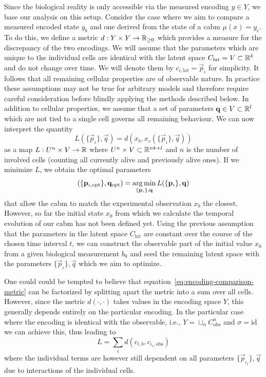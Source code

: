 Since the biological reality is only accessible via the measured encoding $y\in Y$, we base our
analysis on this setup.
Consider the case where we aim to compare a measured encoded state $y_b$ and one derived from the
state of a \ac{cabm} $\mu(x)=y_c$.
To do this, we define a metric $d:Y\times Y\rightarrow\mathbb{R}_{\geq 0}$ which provides a measure for the
discrepancy of the two encodings.
We will assume that the parameters which are unique to the individual cells are identical with the
latent space $C_\text{lat}=V\subset\mathbb{R}^k$ and do not change over time.
We will denote them by $c_{\iota,\text{lat}}=\vec{p}_\iota$ for simplicity.
It follows that all remaining cellular properties are of observable nature.
In practice these assumptions may not be true for arbitrary models and therefore require careful
consideration before blindly applying the methods described below.
In addition to cellular properties, we assume that a set of parameters $\mathbf{q}\in V\subset\mathbb{R}^l$
which are not tied to a single cell governs all remaining behaviour.
We can now interpret the quantity
\begin{equation}
    L(\{\vec{p}_\iota\},\vec{q}) = d(x_b,x_c(\{\vec{p}_\iota\},\vec{q}))
    \label{eq:encoding-comparison-metric}
\end{equation}
as a map $L:U^n\times V\rightarrow\mathbb{R}$ where $U^n\times V\subset\mathbb{R}^{nk+l}$ and $n$ is the number of
involved cells (counting all currently alive and previously alive ones).
If we minimize $L$, we obtain the optimal parameters
\begin{equation}
    (\{\mathbf{p}_{\iota,\text{opt}}\},\mathbf{q}_\text{opt})=
        \operatorname*{arg\,min}_{\{\mathbf{p}_\iota\},\mathbf{q}} L(\{\mathbf{p}_\iota\},\mathbf{q})
\end{equation}
that allow the \ac{cabm} to match the experimental observation $x_b$ the closest.
However, so far the initial state $x_0$ from which we calculate the temporal evolution of our
\ac{cabm} has not been defined yet.
Using the previous assumption that the parameters in the latent space $C_\text{lat}$ are constant
over the course of the chosen time interval $t$, we can construct the observable part of the initial
value $x_0$ from a given biological measurement $b_0$ and seed the remaining latent space with the
parameters $\{\vec{p}_\iota\},\vec{q}$ which we aim to optimize.

One could could be tempted to believe that equation~\eqref{eq:encoding-comparison-metric} can be
factorized by splitting apart the metric into a sum over all cells.
However, since the metric $d(\cdot,\cdot)$ takes values in the encoding space $Y$, this generally
depends entirely on the particular encoding.
In the particular case where the encoding is identical with the observable, i.e.,
$Y=\sqcup_nC_\text{obs}^n$ and $\sigma=\text{id}$ we can achieve this, thus leading to
\begin{equation}
    L=\sum\limits_i d(c_{i,b},c_{\iota_i,\text{obs}})
\end{equation}
where the individual terms are however still dependent on all parameters
$\{\vec{p}_{\iota_i}\},\vec{q}$ due to interactions of the individual cells.

